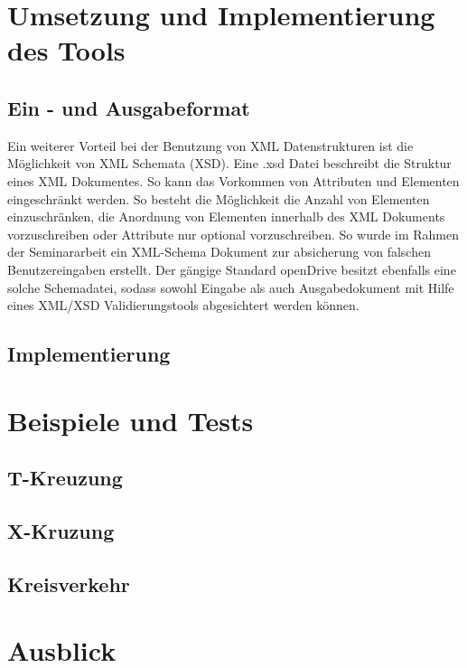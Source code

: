 \chapter{Umsetzung und Implementierung des Tools}
\section{Ein - und Ausgabeformat}

Ein weiterer Vorteil bei der Benutzung von XML Datenstrukturen ist die Möglichkeit von XML Schemata (XSD). Eine .xsd Datei beschreibt die Struktur eines XML Dokumentes. So kann das Vorkommen von Attributen und Elementen eingeschränkt werden. So besteht die Möglichkeit die Anzahl von Elementen einzuschränken, die Anordnung von Elementen innerhalb des XML Dokuments vorzuschreiben oder Attribute nur optional vorzuschreiben. So wurde im Rahmen der Seminararbeit ein XML-Schema Dokument zur absicherung von falschen Benutzereingaben erstellt. Der gängige Standard openDrive besitzt ebenfalls eine solche Schemadatei, sodass sowohl Eingabe als auch Ausgabedokument mit Hilfe eines XML/XSD Validierungstools abgesichtert werden können.
 
\section{Implementierung}

\chapter{Beispiele und Tests}
\section{T-Kreuzung}
\section{X-Kruzung}
\section{Kreisverkehr}

\chapter{Ausblick}



